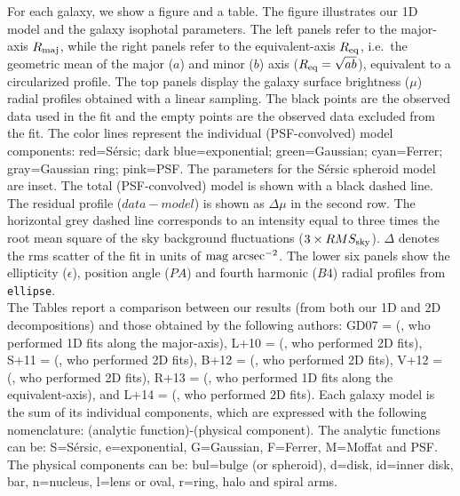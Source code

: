 \documentclass[preprint2]{emulateapj}
\begin{document}
  For each galaxy, we show a figure and a table. 
  The figure illustrates our 1D model and the galaxy isophotal parameters. 
  The left panels refer to the major-axis $R_{\rm maj}$, 
  while the right panels refer to the equivalent-axis $R_{\rm eq}$, 
  i.e.~the geometric mean of the major ($a$) and minor ($b$) axis ($R_{\rm eq} = \sqrt{ab}$), 
  equivalent to a circularized profile.
  The top panels display the galaxy surface brightness ($\mu$) radial profiles obtained with a linear sampling. 
  The black points are the observed data used in the fit and the empty points are the observed data excluded from the fit.  
  The color lines represent the individual (PSF-convolved) model components:
  red=S\'ersic; dark blue=exponential; green=Gaussian; cyan=Ferrer; gray=Gaussian ring; pink=PSF. 
  The parameters for the S\'ersic spheroid model are inset.
  The total (PSF-convolved) model is shown with a black dashed line. 
  The residual profile ($data - model$) is shown as $\Delta \mu$ in the second row.
  The horizontal grey dashed line corresponds to an intensity 
  equal to three times the root mean square of the sky background fluctuations ($3 \times RMS_{\rm sky}$).
  $\Delta$ denotes the rms scatter of the fit in units of $\rm mag~arcsec^{-2}$.
  The lower six panels show the ellipticity ($\epsilon$), position angle ($PA$) and fourth harmonic ($B4$) radial profiles from {\tt ellipse}. \\
  The Tables report a comparison between our results (from both our 1D and 2D decompositions) and those obtained by the following authors: 
  GD07 = \citeauthor{grahamdriver2007} (\citeyear{grahamdriver2007}, who performed 1D fits along the major-axis), 
  L+10 = \citeauthor{laurikainen2010} (\citeyear{laurikainen2010}, who performed 2D fits), 
  S+11 = \citeauthor{sani2011} (\citeyear{sani2011}, who performed 2D fits), 
  B+12 = \citeauthor{beifiori2012} (\citeyear{beifiori2012}, who performed 2D fits), 
  V+12 = \citeauthor{vika2012} (\citeyear{vika2012}, who performed 2D fits), 
  R+13 = \citeauthor{rusli2013} (\citeyear{rusli2013}, who performed 1D fits along the equivalent-axis),
  and L+14 = \citeauthor{lasker2014data} (\citeyear{lasker2014data}, who performed 2D fits).
  Each galaxy model is the sum of its individual components, which are expressed with the following nomenclature: (analytic function)-(physical component).
  The analytic functions can be: S=S\'ersic, e=exponential, G=Gaussian, F=Ferrer, M=Moffat and PSF.
  The physical components can be: bul=bulge (or spheroid), d=disk, id=inner disk, bar, n=nucleus, l=lens or oval, r=ring, halo and spiral arms. 
\end{document}
